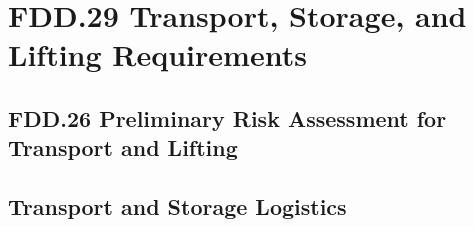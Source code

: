\section{FDD.29 Transport, Storage, and Lifting Requirements}
\subsection{FDD.26 Preliminary Risk Assessment for Transport and Lifting}
\subsection{Transport and Storage Logistics}
